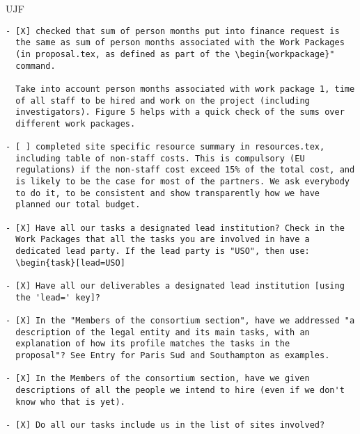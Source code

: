 \begin{sitedescription}{UJF}

\end{sitedescription}



\begin{draft}
\vspace{1cm}

\begin{verbatim}
- [X] checked that sum of person months put into finance request is
  the same as sum of person months associated with the Work Packages
  (in proposal.tex, as defined as part of the \begin{workpackage}"
  command.
  
  Take into account person months associated with work package 1, time
  of all staff to be hired and work on the project (including
  investigators). Figure 5 helps with a quick check of the sums over
  different work packages.

- [ ] completed site specific resource summary in resources.tex,
  including table of non-staff costs. This is compulsory (EU
  regulations) if the non-staff cost exceed 15% of the total cost, and
  is likely to be the case for most of the partners. We ask everybody
  to do it, to be consistent and show transparently how we have
  planned our total budget.

- [X] Have all our tasks a designated lead institution? Check in the
  Work Packages that all the tasks you are involved in have a
  dedicated lead party. If the lead party is "USO", then use:
  \begin{task}[lead=USO]

- [X] Have all our deliverables a designated lead institution [using
  the 'lead=' key]?

- [X] In the "Members of the consortium section", have we addressed "a
  description of the legal entity and its main tasks, with an
  explanation of how its profile matches the tasks in the
  proposal"? See Entry for Paris Sud and Southampton as examples.

- [X] In the Members of the consortium section, have we given
  descriptions of all the people we intend to hire (even if we don't
  know who that is yet). 
  
- [X] Do all our tasks include us in the list of sites involved?
\end{verbatim}
\end{draft}

